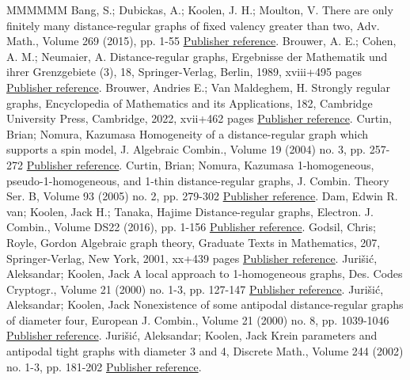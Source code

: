 \documentclass[11pt]{article}
\theoremstyle{definition}
\numberwithin{equation}{section}
\numberwithin{equation}{section}
\begin{document}
\begin{thebibliography}{MMMMMM}
 Bang, S.; Dubickas, A.; Koolen, J. H.; Moulton, V. There are only finitely many distance-regular graphs of fixed valency greater than two, Adv. Math., Volume 269 (2015), pp. 1-55 \href{https://alco.centre-mersenne.org/articles/10.5802/alco.454/#BDKM}{Publisher reference}.
 Brouwer, A. E.; Cohen, A. M.; Neumaier, A. Distance-regular graphs, Ergebnisse der Mathematik und ihrer Grenzgebiete (3), 18, Springer-Verlag, Berlin, 1989, xviii+495 pages \href{https://alco.centre-mersenne.org/articles/10.5802/alco.454/#BCN}{Publisher reference}.
 Brouwer, Andries E.; Van Maldeghem, H. Strongly regular graphs, Encyclopedia of Mathematics and its Applications, 182, Cambridge University Press, Cambridge, 2022, xvii+462 pages \href{https://alco.centre-mersenne.org/articles/10.5802/alco.454/#BrVM2022}{Publisher reference}.
 Curtin, Brian; Nomura, Kazumasa Homogeneity of a distance-regular graph which supports a spin model, J. Algebraic Combin., Volume 19 (2004) no. 3, pp. 257-272 \href{https://alco.centre-mersenne.org/articles/10.5802/alco.454/#CurtinNomura2004}{Publisher reference}.
 Curtin, Brian; Nomura, Kazumasa 1-homogeneous, pseudo-1-homogeneous, and 1-thin distance-regular graphs, J. Combin. Theory Ser. B, Volume 93 (2005) no. 2, pp. 279-302 \href{https://alco.centre-mersenne.org/articles/10.5802/alco.454/#CurtinNomura2005}{Publisher reference}.
 Dam, Edwin R. van; Koolen, Jack H.; Tanaka, Hajime Distance-regular graphs, Electron. J. Combin., Volume DS22 (2016), pp. 1-156 \href{https://alco.centre-mersenne.org/articles/10.5802/alco.454/#DaKoTa}{Publisher reference}.
 Godsil, Chris; Royle, Gordon Algebraic graph theory, Graduate Texts in Mathematics, 207, Springer-Verlag, New York, 2001, xx+439 pages \href{https://alco.centre-mersenne.org/articles/10.5802/alco.454/#GR01}{Publisher reference}.
 Jurišić, Aleksandar; Koolen, Jack A local approach to 1-homogeneous graphs, Des. Codes Cryptogr., Volume 21 (2000) no. 1-3, pp. 127-147 \href{https://alco.centre-mersenne.org/articles/10.5802/alco.454/#JK2000-1}{Publisher reference}.
 Jurišić, Aleksandar; Koolen, Jack Nonexistence of some antipodal distance-regular graphs of diameter four, European J. Combin., Volume 21 (2000) no. 8, pp. 1039-1046 \href{https://alco.centre-mersenne.org/articles/10.5802/alco.454/#JK2000-2}{Publisher reference}.
 Jurišić, Aleksandar; Koolen, Jack Krein parameters and antipodal tight graphs with diameter 3 and 4, Discrete Math., Volume 244 (2002) no. 1-3, pp. 181-202 \href{https://alco.centre-mersenne.org/articles/10.5802/alco.454/#JK2002}{Publisher reference}.

\end{thebibliography}
\end{document}
